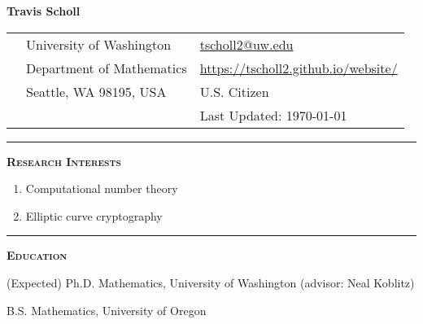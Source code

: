 \documentclass[12pt]{article}
\newcommand{\sectionheading}[1]
{
\bigskip %
\noindent
\hspace{-6.5mm}\textcolor{Gray}{\rule[.75mm]{21.5mm}{1mm}} %
\hspace{.2mm}	%
{\large{\textbf{\textsc{#1}}}} %
}
\newenvironment{date_section}
	{
	\vspace{-1ex}
	\leftmargini = 15ex
		\begin{itemize}[
			labelsep = *,
			labelwidth = 9ex,
			labelindent = 0ex,
			itemindent = !,
			font=\normalfont,
			align=parleft
		]{}
		\itemsep=-1.5mm
	}
	{\end{itemize}\vspace{-2ex}}
\newcommand{\yearmo}[2]{
	\item[
		{\makebox[1ex][r]{#1}}
		\hspace{1ex}
		{\makebox[1ex][l]{#2} }
		] }
\begin{document}

	\thispagestyle{empty}

	\centerline{{\LARGE \textbf{Travis Scholl}}}

	\vspace{3mm}

	\begin{center}
		\begin{tabular}[c]{lll} %
			\phantom{aaaaaaaaa} %
			& University of Washington
				& \url{tscholl2@uw.edu} \\
 			& Department of Mathematics
				& \url{https://tscholl2.github.io/website/}\\
 			& Seattle, WA 98195, USA
	 			& U.S. Citizen \\
			&
				& Last Updated: \today
		\end{tabular}
	\end{center}

	\sectionheading{Research Interests}%
	
	\vspace{1ex}
	
	\begin{enumerate}[label=$\bullet$, itemsep=-1mm, leftmargin=24mm]
		\item Computational number theory
		\item Elliptic curve cryptography
	\end{enumerate}

	\sectionheading{Education}%

		\begin{date_section}

			\yearmo{}{2018} (Expected) Ph.D. Mathematics, University of Washington (advisor: Neal Koblitz)

			\yearmo{}{2013} %
			B.S. Mathematics, University of Oregon





		\end{date_section}
\end{document}
